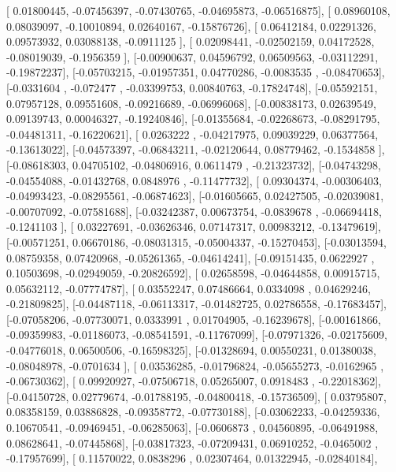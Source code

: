 \documentclass{article}
\begin{document}
       [ 0.01800445, -0.07456397, -0.07430765, -0.04695873, -0.06516875],
       [ 0.08960108,  0.08039097, -0.10010894,  0.02640167, -0.15876726],
       [ 0.06412184,  0.02291326,  0.09573932,  0.03088138, -0.0911125 ],
       [ 0.02098441, -0.02502159,  0.04172528, -0.08019039, -0.1956359 ],
       [-0.00900637,  0.04596792,  0.06509563, -0.03112291, -0.19872237],
       [-0.05703215, -0.01957351,  0.04770286, -0.0083535 , -0.08470653],
       [-0.0331604 , -0.072477  , -0.03399753,  0.00840763, -0.17824748],
       [-0.05592151,  0.07957128,  0.09551608, -0.09216689, -0.06996068],
       [-0.00838173,  0.02639549,  0.09139743,  0.00046327, -0.19240846],
       [-0.01355684, -0.02268673, -0.08291795, -0.04481311, -0.16220621],
       [ 0.0263222 , -0.04217975,  0.09039229,  0.06377564, -0.13613022],
       [-0.04573397, -0.06843211, -0.02120644,  0.08779462, -0.1534858 ],
       [-0.08618303,  0.04705102, -0.04806916,  0.0611479 , -0.21323732],
       [-0.04743298, -0.04554088, -0.01432768,  0.0848976 , -0.11477732],
       [ 0.09304374, -0.00306403, -0.04993423, -0.08295561, -0.06874623],
       [-0.01605665,  0.02427505, -0.02039081, -0.00707092, -0.07581688],
       [-0.03242387,  0.00673754, -0.0839678 , -0.06694418, -0.1241103 ],
       [ 0.03227691, -0.03626346,  0.07147317,  0.00983212, -0.13479619],
       [-0.00571251,  0.06670186, -0.08031315, -0.05004337, -0.15270453],
       [-0.03013594,  0.08759358,  0.07420968, -0.05261365, -0.04614241],
       [-0.09151435,  0.0622927 ,  0.10503698, -0.02949059, -0.20826592],
       [ 0.02658598, -0.04644858,  0.00915715,  0.05632112, -0.07774787],
       [ 0.03552247,  0.07486664,  0.0334098 ,  0.04629246, -0.21809825],
       [-0.04487118, -0.06113317, -0.01482725,  0.02786558, -0.17683457],
       [-0.07058206, -0.07730071,  0.0333991 ,  0.01704905, -0.16239678],
       [-0.00161866, -0.09359983, -0.01186073, -0.08541591, -0.11767099],
       [-0.07971326, -0.02175609, -0.04776018,  0.06500506, -0.16598325],
       [-0.01328694,  0.00550231,  0.01380038, -0.08048978, -0.0701634 ],
       [ 0.03536285, -0.01796824, -0.05655273, -0.0162965 , -0.06730362],
       [ 0.09920927, -0.07506718,  0.05265007,  0.0918483 , -0.22018362],
       [-0.04150728,  0.02779674, -0.01788195, -0.04800418, -0.15736509],
       [ 0.03795807,  0.08358159,  0.03886828, -0.09358772, -0.07730188],
       [-0.03062233, -0.04259336,  0.10670541, -0.09469451, -0.06285063],
       [-0.0606873 ,  0.04560895, -0.06491988,  0.08628641, -0.07445868],
       [-0.03817323, -0.07209431,  0.06910252, -0.0465002 , -0.17957699],
       [ 0.11570022,  0.0838296 ,  0.02307464,  0.01322945, -0.02840184],
\end{document}
